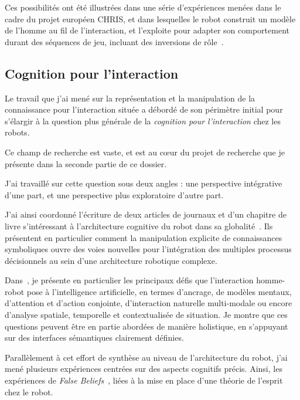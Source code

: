 \documentclass[a4paper]{article}
\begin{document}
Ces possibilités ont été illustrées dans une série d'expériences menées dans le
cadre du projet européen CHRIS, et dans lesquelles le robot construit un modèle de
l'homme au fil de l'interaction, et l'exploite pour adapter son comportement durant
des séquences de jeu, incluant des inversions de rôle~\cite{Lallee2010b,
Lallee2011, Lallee2012}.



\subsection{Cognition pour l'interaction%
  \label{cognition-for-interaction}%
}

Le travail que j'ai mené sur la représentation et la manipulation de la
connaissance pour l'interaction située a débordé de son périmètre
initial pour s'élargir à la question plus générale de la \emph{cognition pour
l'interaction} chez les robots.

Ce champ de recherche est vaste, et est au c\oe ur du projet de recherche que je
présente dans la seconde partie de ce dossier.

J'ai travaillé sur cette question sous deux angles : une perspective
intégrative d'une part, et une perspective plus exploratoire d'autre part.

J'ai ainsi coordonné l'écriture de deux articles de journaux et d'un chapitre de
livre s'intéressant à l'architecture cognitive du robot dans sa
globalité~\cite{alami2011when, Lemaignan2012, lemaignan2014human}. Ils
présentent en particulier comment la manipulation explicite de connaissances
symboliques ouvre des voies nouvelles pour l'intégration des multiples processus
décisionnels au sein d'une architecture robotique complexe.

Dans~\cite{lemaignan2014human}, je présente en particulier les
principaux défis que l'interaction homme-robot pose à l'intelligence
artificielle, en termes d'ancrage, de modèles mentaux, d'attention et
d'action conjointe, d'interaction naturelle multi-modale ou encore d'analyse
spatiale, temporelle et contextualisée de situation. Je montre que ces
questions peuvent être en partie abordées de manière holistique, en s'appuyant
sur des interfaces sémantiques clairement définies.

Parallèlement à cet effort de synthèse au niveau de l'architecture du
robot, j'ai mené plusieurs expériences centrées sur des aspects cognitifs
précis. Ainsi, les expériences de \emph{False Beliefs}~\cite{warnier2012when},
liées à la mise en place d'une théorie de l'esprit chez le robot.
\end{document}
